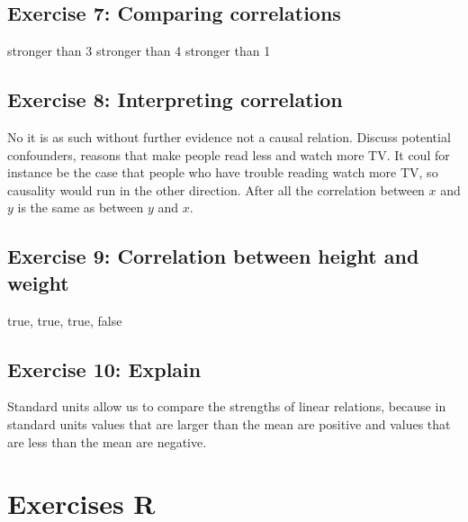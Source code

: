 \documentclass[letterpaper,10pt,english]{jupyterBook}
\begin{document}
\subsection{Exercise 7: Comparing correlations}
\label{\detokenize{exercises_unit_4:exercise-7-comparing-correlations}}
 stronger than 3 stronger than 4 stronger than 1


\subsection{Exercise 8: Interpreting correlation}
\label{\detokenize{exercises_unit_4:exercise-8-interpreting-correlation}}
\sphinxAtStartPar
No it is as such without further evidence not a causal relation. Discuss potential confounders, reasons that make people read less and watch more TV. It coul for instance be the case that people who have trouble reading watch more TV, so causality would run in the other direction. After all the correlation between \(x\) and \(y\) is the same as between \(y\) and \(x\).


\subsection{Exercise 9: Correlation between height and weight}
\label{\detokenize{exercises_unit_4:exercise-9-correlation-between-height-and-weight}}
\sphinxAtStartPar
true, true, true, false


\subsection{Exercise 10: Explain}
\label{\detokenize{exercises_unit_4:exercise-10-explain}}
\sphinxAtStartPar
Standard units allow us to compare the strengths of linear relations, because in standard units values that are larger than the mean are positive and values that are less than the mean are negative.


\section{Exercises R}
\label{\detokenize{exercises_unit_4:exercises-r}}
\end{document}
